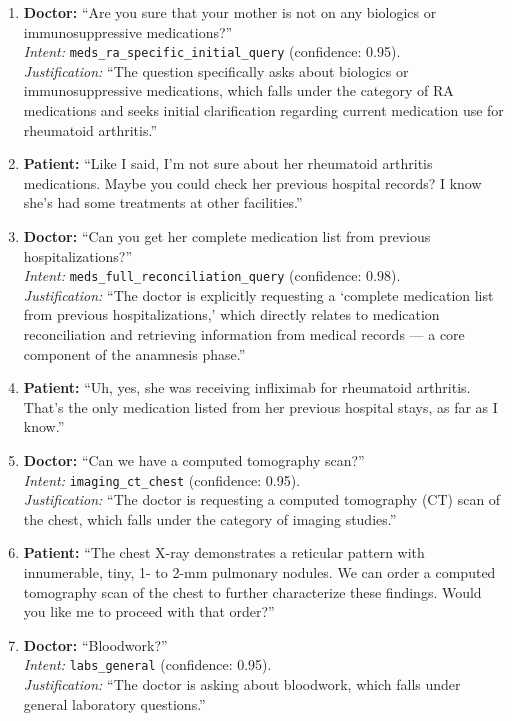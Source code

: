 \begin{enumerate}
  \item \textbf{Doctor:} ``Are you sure that your mother is not on any biologics or immunosuppressive medications?'' \\
  \emph{Intent:} \texttt{meds\_ra\_specific\_initial\_query} (confidence: 0.95). \\
  \emph{Justification:} ``The question specifically asks about biologics or immunosuppressive medications, which falls under the category of RA medications and seeks initial clarification regarding current medication use for rheumatoid arthritis.''

  \item \textbf{Patient:} ``Like I said, I'm not sure about her rheumatoid arthritis medications. Maybe you could check her previous hospital records? I know she's had some treatments at other facilities.''

  \item \textbf{Doctor:} ``Can you get her complete medication list from previous hospitalizations?'' \\
  \emph{Intent:} \texttt{meds\_full\_reconciliation\_query} (confidence: 0.98). \\
  \emph{Justification:} ``The doctor is explicitly requesting a `complete medication list from previous hospitalizations,' which directly relates to medication reconciliation and retrieving information from medical records --- a core component of the anamnesis phase.''

  \item \textbf{Patient:} ``Uh, yes, she was receiving infliximab for rheumatoid arthritis. That's the only medication listed from her previous hospital stays, as far as I know.''

  \item \textbf{Doctor:} ``Can we have a computed tomography scan?'' \\
  \emph{Intent:} \texttt{imaging\_ct\_chest} (confidence: 0.95). \\
  \emph{Justification:} ``The doctor is requesting a computed tomography (CT) scan of the chest, which falls under the category of imaging studies.''

  \item \textbf{Patient:} ``The chest X-ray demonstrates a reticular pattern with innumerable, tiny, 1- to 2-mm pulmonary nodules. We can order a computed tomography scan of the chest to further characterize these findings. Would you like me to proceed with that order?''

  \item \textbf{Doctor:} ``Bloodwork?'' \\
  \emph{Intent:} \texttt{labs\_general} (confidence: 0.95). \\
  \emph{Justification:} ``The doctor is asking about bloodwork, which falls under general laboratory questions.''


\end{enumerate}

